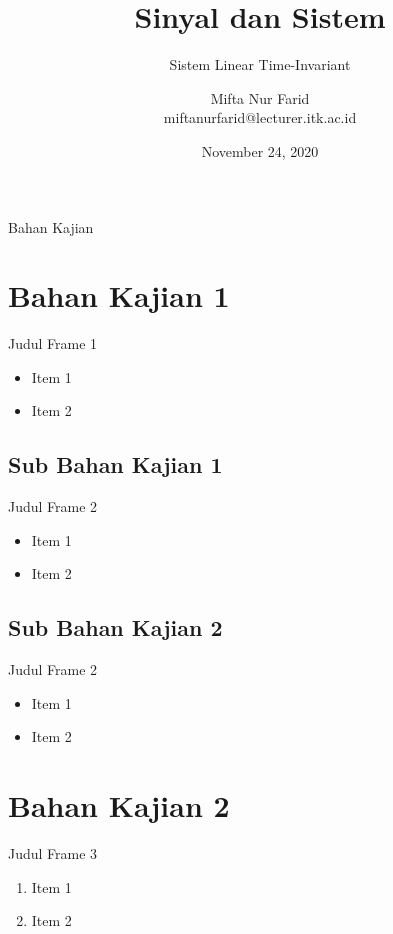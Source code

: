 \documentclass[aspectratio=169]{beamer}
\author{Mifta Nur Farid \\
	miftanurfarid@lecturer.itk.ac.id}
\title{Sinyal dan Sistem}
\subtitle{Sistem Linear Time-Invariant}
\institute{Teknik Elektro \\ Institut Teknologi Kalimantan \\ Balikpapan, Indonesia}
\date{\tiny November 24, 2020}
\begin{document}
\begin{frame}[t,plain]
\titlepage
\end{frame}

\begin{frame}{Bahan Kajian}
    \tableofcontents[subsectionstyle=hide]
\end{frame}

\section{Bahan Kajian 1}
\begin{frame}{Judul Frame 1}
	\begin{itemize}
		\item Item 1
		\item Item 2
	\end{itemize}
\end{frame}

\subsection{Sub Bahan Kajian 1}
\begin{frame}{Judul Frame 2}
	\begin{itemize}
		\item Item 1
		\item Item 2
	\end{itemize}
\end{frame}

\subsection{Sub Bahan Kajian 2}
\begin{frame}{Judul Frame 2}
	\begin{itemize}
		\item Item 1
		\item Item 2
	\end{itemize}
\end{frame}

\section{Bahan Kajian 2}
\begin{frame}{Judul Frame 3}
	\begin{enumerate}
		\item Item 1
		\item Item 2
	\end{enumerate}
\end{frame}
\end{document}
